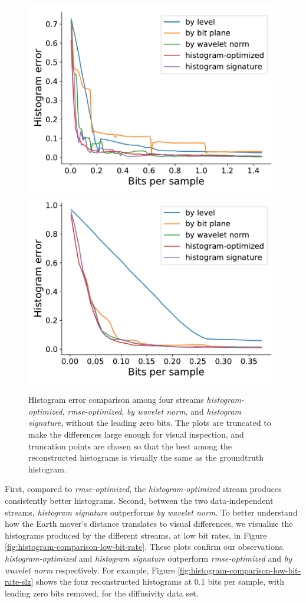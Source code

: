 \begin{figure}[h]
	{\includegraphics[width=0.48\linewidth]{img/histogram/64bins/histogram-optimized-turbulence.pdf}}
	{\includegraphics[width=0.48\linewidth]{img/histogram/64bins/histogram-optimized-velocityz.pdf}}
	\caption{Histogram error comparison among four streams \emph{histogram-optimized},
	\emph{rmse-optimized}, \emph{by wavelet norm}, and \emph{histogram signature}, without the leading
	zero bits. The plots are truncated to make the differences large enough for visual inspection, and
	truncation points are chosen so that the best among the reconstructed histograms is visually the
	same as the groundtruth histogram. }
	\label{fig:histogram-stream-comparison}
\end{figure}

First, compared to \emph{rmse-optimized}, the \emph{histogram-optimized} stream produces
consistently better histograms. Second, between the two data-independent streams, \emph{histogram
signature} outperforms \emph{by wavelet norm}. To better understand how the Earth mover's distance
translates to visual differences, we visualize the histograms produced by the different streams, at
low bit rates, in Figure \ref{fig:histogram-comparison-low-bit-rate}. These plots confirm our
observations.
\emph{histogram-optimized} and \emph{histogram signature}
outperform \emph{rmse-optimized} and \emph{by wavelet norm} respectively. For example, Figure
\ref{fig:histogram-comparison-low-bit-rate-slz} shows the four reconstructed histograms at 0.1 bits
per sample, with leading zero bits removed, for the diffusivity data set.

